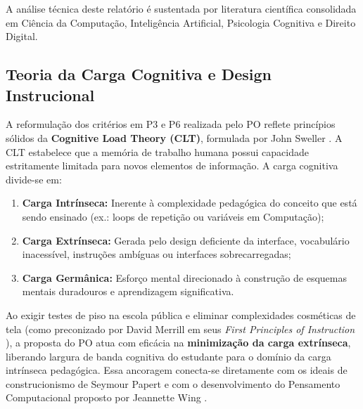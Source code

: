 \documentclass[11pt,a4paper]{article}
\begin{document}
A análise técnica deste relatório é sustentada por literatura científica consolidada em Ciência da Computação, Inteligência Artificial, Psicologia Cognitiva e Direito Digital.

\subsection{Teoria da Carga Cognitiva e Design Instrucional}
A reformulação dos critérios em P3 e P6 realizada pelo PO reflete princípios sólidos da \textbf{Cognitive Load Theory (CLT)}, formulada por John Sweller \cite{sweller1988cognitive,sweller2011cognitive,paas2003cognitive,vanmerrienboer2005cognitive}. A CLT estabelece que a memória de trabalho humana possui capacidade estritamente limitada para novos elementos de informação.
A carga cognitiva divide-se em:
\begin{enumerate}[label=\alph*.]
    \item \textbf{Carga Intrínseca:} Inerente à complexidade pedagógica do conceito que está sendo ensinado (ex.: loops de repetição ou variáveis em Computação);
    \item \textbf{Carga Extrínseca:} Gerada pelo design deficiente da interface, vocabulário inacessível, instruções ambíguas ou interfaces sobrecarregadas;
    \item \textbf{Carga Germânica:} Esforço mental direcionado à construção de esquemas mentais duradouros e aprendizagem significativa.
\end{enumerate}
Ao exigir testes de piso na escola pública e eliminar complexidades cosméticas de tela (como preconizado por David Merrill em seus \textit{First Principles of Instruction} \cite{merrill2002first}), a proposta do PO atua com eficácia na \textbf{minimização da carga extrínseca}, liberando largura de banda cognitiva do estudante para o domínio da carga intrínseca pedagógica. Essa ancoragem conecta-se diretamente com os ideais de construcionismo de Seymour Papert \cite{papert1980mindstorms} e com o desenvolvimento do Pensamento Computacional proposto por Jeannette Wing \cite{wing2006computational}.
\end{document}
